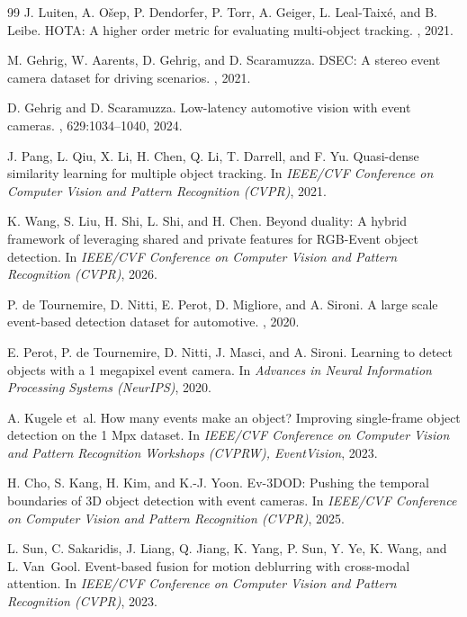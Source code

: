 \documentclass[10pt,twocolumn,letterpaper]{article}
\begin{document}
{\begin{thebibliography}{99}
J. Luiten, A. O\v{s}ep, P. Dendorfer, P. Torr, A. Geiger, L. Leal-Taix\'e, and
B. Leibe.
\newblock HOTA: A higher order metric for evaluating multi-object tracking.
, 2021.

M. Gehrig, W. Aarents, D. Gehrig, and D. Scaramuzza.
\newblock DSEC: A stereo event camera dataset for driving scenarios.
, 2021.

D. Gehrig and D. Scaramuzza.
\newblock Low-latency automotive vision with event cameras.
, 629:1034--1040, 2024.

J. Pang, L. Qiu, X. Li, H. Chen, Q. Li, T. Darrell, and F. Yu.
\newblock Quasi-dense similarity learning for multiple object tracking.
\newblock In {\em IEEE/CVF Conference on Computer Vision and Pattern Recognition
(CVPR)}, 2021.

K. Wang, S. Liu, H. Shi, L. Shi, and H. Chen.
\newblock Beyond duality: A hybrid framework of leveraging shared and private
features for RGB-Event object detection.
\newblock In {\em IEEE/CVF Conference on Computer Vision and Pattern Recognition
(CVPR)}, 2026.

P. de Tournemire, D. Nitti, E. Perot, D. Migliore, and A. Sironi.
\newblock A large scale event-based detection dataset for automotive.
, 2020.

E. Perot, P. de Tournemire, D. Nitti, J. Masci, and A. Sironi.
\newblock Learning to detect objects with a 1 megapixel event camera.
\newblock In {\em Advances in Neural Information Processing Systems (NeurIPS)},
2020.

A. Kugele et~al.
\newblock How many events make an object? Improving single-frame object
detection on the 1 Mpx dataset.
\newblock In {\em IEEE/CVF Conference on Computer Vision and Pattern Recognition
Workshops (CVPRW), EventVision}, 2023.

H. Cho, S. Kang, H. Kim, and K.-J. Yoon.
\newblock Ev-3DOD: Pushing the temporal boundaries of 3D object detection with
event cameras.
\newblock In {\em IEEE/CVF Conference on Computer Vision and Pattern Recognition
(CVPR)}, 2025.

L. Sun, C. Sakaridis, J. Liang, Q. Jiang, K. Yang, P. Sun, Y. Ye, K. Wang, and
L. Van~Gool.
\newblock Event-based fusion for motion deblurring with cross-modal attention.
\newblock In {\em IEEE/CVF Conference on Computer Vision and Pattern Recognition
(CVPR)}, 2023.


\end{thebibliography}}
\end{document}
